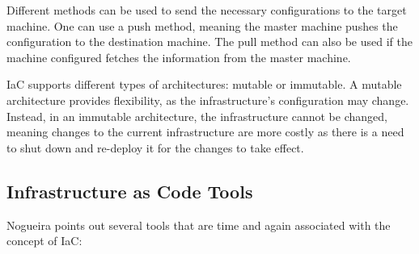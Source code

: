 Different methods can be used to send the necessary configurations to the target machine. One can use a push method, meaning the master machine pushes the configuration to the destination machine. The pull method can also be used if the machine configured fetches the information from the master machine.

IaC supports different types of architectures: mutable or immutable. A mutable architecture provides flexibility, as the infrastructure's configuration may change. Instead, in an immutable architecture, the infrastructure cannot be changed, meaning changes to the current infrastructure are more costly as there is a need to shut down and re-deploy it for the changes to take effect.

\subsection{Infrastructure as Code Tools} \label{sec:iac_tools}

Nogueira \cite{automating_open_source_up_ref} points out several tools that are time and again associated with the concept of IaC:

